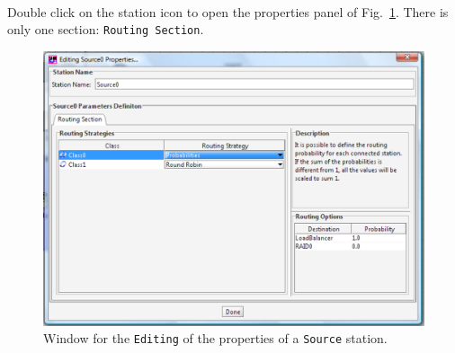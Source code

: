 \\ Double
click on the station icon to open the properties panel of
Fig.~\ref{fig:statprop}. There is only one section:
\texttt{Routing Section}.\\
\begin{figure}[htb]
    \begin{center}
        \includegraphics[scale=.5]{img/jsimg/8.5.eps}
    \end{center}
    \caption{Window for the \texttt{Editing} of the properties of a
    \texttt{Source} station.}
    \label{fig:statprop}
\end{figure}

